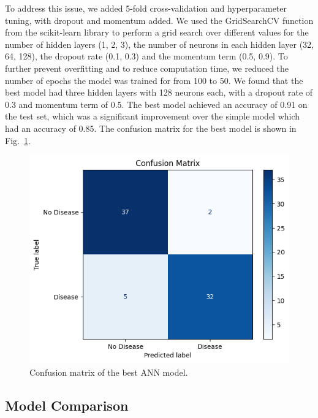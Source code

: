 To address this issue, we added 5-fold cross-validation and hyperparameter tuning, with dropout and momentum added. We used the GridSearchCV function from the scikit-learn library to perform a grid search over different values for the number of hidden layers (1, 2, 3), the number of neurons in each hidden layer (32, 64, 128), the dropout rate (0.1, 0.3) and the momentum term (0.5, 0.9). To further prevent overfitting and to reduce computation time, we reduced the number of epochs the model was trained for from 100 to 50. We found that the best model had three hidden layers with 128 neurons each, with a dropout rate of 0.3 and momentum term of 0.5. The best model achieved an accuracy of 0.91 on the test set, which was a significant improvement over the simple model which had an accuracy of 0.85. The confusion matrix for the best model is shown in Fig.~\ref{annconfusion}.

\begin{figure}[htbp]
    \centerline{\includegraphics[scale=.65]{img/annconfusion.png}}
    \caption{Confusion matrix of the best ANN model.}\label{annconfusion}
\end{figure}

\subsection{Model Comparison}